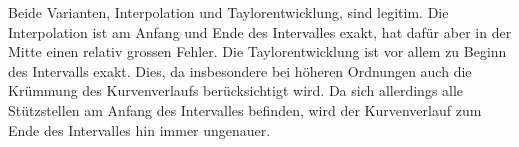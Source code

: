 Beide Varianten, Interpolation und Taylorentwicklung, sind legitim. 
Die Interpolation ist am Anfang und Ende des Intervalles exakt, hat dafür aber in der Mitte einen relativ grossen Fehler. 
Die Taylorentwicklung ist vor allem zu Beginn des Intervalls exakt. 
Dies, da insbesondere bei höheren Ordnungen auch die Krümmung des Kurvenverlaufs berücksichtigt wird.
 Da sich allerdings alle Stützstellen am Anfang des Intervalles befinden, wird der Kurvenverlauf zum Ende des Intervalles hin immer ungenauer.
